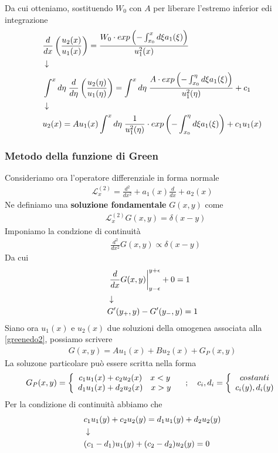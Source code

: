 Da cui otteniamo, sostituendo $W_0$ con $A$ per liberare l'estremo inferior edi integrazione
\begin{align}
	&\frac{d}{dx} \left( \frac{u_2(x)}{u_1(x)} \right) = \frac{W_0\cdot exp\left( -\int_{x_0}^{x} d\xi a_1(\xi) \right)}{u_1^2(x)} \\ &\downarrow \nonumber \\
	& \int^x d\eta \; \frac{d}{d\eta} \left( \frac{u_2(\eta)}{u_1(\eta)} \right) =\int^x d\eta \; \frac{A \cdot exp\left( -\int_{x_0}^{\eta} d\xi a_1(\xi) \right)}{u_1^2(\eta)} + c_1 \nonumber \\ &\downarrow \nonumber \\
	&u_2(x) = Au_1(x) \int^x d\eta \; \frac{1}{u_1^2(\eta)}\cdot exp\left( -\int_{x_0}^{\eta} d\xi a_1(\xi) \right) + c_1u_1(x)
\end{align}


\subsubsection{Metodo della funzione di Green}
Consideriamo ora l'operatore differenziale in forma normale
\begin{align}
	\mathcal{L}_x^{(2)} =\frac{d^2}{dx^2} + a_1(x)\frac{d}{dx} + a_2(x)
\end{align}
Ne definiamo una \textbf{soluzione fondamentale} $G(x,y)$ come
\begin{align}
	&\mathcal{L}_x^{(2)} G(x,y)= \delta(x-y) \label{greenedo2}
\end{align}
Imponiamo la condzione di continuità 
\begin{align}
	&\frac{d^2}{dx^2}G(x,y) \propto \delta(x-y)
\end{align}
Da cui 
\begin{align}
	&\left.\frac{d}{dx}G(x,y) \right|_{y-\epsilon}^{y+\epsilon} + 0 = 1 \\ &\downarrow \nonumber \\
	&G'(y_+,y) - G'(y_-,y) = 1
\end{align}
Siano ora $u_1(x)$ e $u_2(x)$ due soluzioni della omogenea associata alla \ref{greenedo2}, possiamo scrivere
\begin{align}
	G(x,y) = A u_1(x) + B u_2(x) + G_P(x,y)
\end{align}
La soluzone particolare può essere scritta nella forma
\begin{align}
	G_P(x,y) = \left\{ \begin{array}{cc} c_1 u_1 (x) + c_2 u_2 (x) \quad x<y\\ d_1 u_1 (x) + d_2 u_2 (x) \quad x>y \end{array} \right. \quad ; \quad c_i,d_i = \left\{ \begin{array}{cc} costanti\\ c_i(y), d_i(y) \end{array} \right.
\end{align}
Per la condizione di continuità abbiamo che
\begin{align}
	&c_1 u_1 (y) + c_2 u_2 (y) = d_1 u_1 (y) + d_2 u_2 (y)\\ &\downarrow \nonumber \\
	&(c_1 - d_1) u_1 (y) +(c_2 - d_2)u_2 (y) =0
\end{align}
